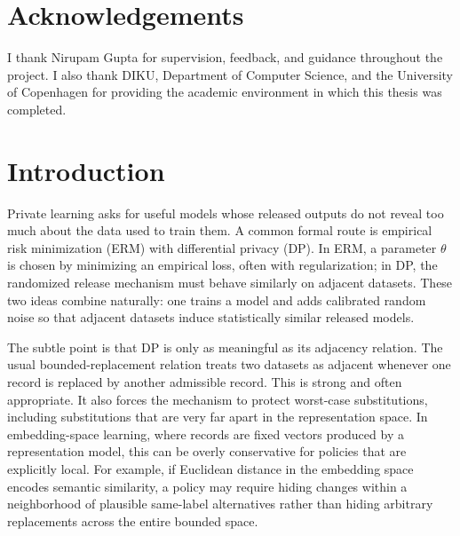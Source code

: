 \documentclass[11pt,a4paper]{report}
\theoremstyle{plain}
\theoremstyle{definition}
\theoremstyle{remark}
\begin{document}
\begin{abstract}
The thesis also develops a nonconvex transcript extension for DP-SGD.  This part distinguishes known-inclusion revealed transcripts, safe hidden-inclusion certificates obtained by post-processing, and observation-model-specific hidden-mixture diagnostics.  The theory uses probability kernels, kernel domination, and reference Bernoulli--Gaussian experiments, and records operator-norm sensitivity certificates for binary and multiclass tanh networks.  A controlled synthetic nonconvex experiment shows that a finite-prior Bayesian transcript attack perfectly reconstructs the noiseless known-inclusion transcript, while Ball-DP and standard DP-SGD both suppress the attack to chance-level success.  Ball-DP achieves this empirical protection with a noise multiplier about four times smaller and substantially higher public accuracy, supporting the thesis's central message in a limited nonconvex setting.
\end{abstract}

\chapter*{Acknowledgements}
I thank Nirupam Gupta for supervision, feedback, and guidance throughout the project.  I also thank DIKU, Department of Computer Science, and the University of Copenhagen for providing the academic environment in which this thesis was completed.

\tableofcontents
\listoffigures
\listoftables

\chapter{Introduction}
\label{ch:introduction}

Private learning asks for useful models whose released outputs do not reveal too much about the data used to train them.  A common formal route is empirical risk minimization (ERM) with differential privacy (DP).  In ERM, a parameter $\theta$ is chosen by minimizing an empirical loss, often with regularization; in DP, the randomized release mechanism must behave similarly on adjacent datasets.  These two ideas combine naturally: one trains a model and adds calibrated random noise so that adjacent datasets induce statistically similar released models.

The subtle point is that DP is only as meaningful as its adjacency relation.  The usual bounded-replacement relation treats two datasets as adjacent whenever one record is replaced by another admissible record.  This is strong and often appropriate.  It also forces the mechanism to protect worst-case substitutions, including substitutions that are very far apart in the representation space.  In embedding-space learning, where records are fixed vectors produced by a representation model, this can be overly conservative for policies that are explicitly local.  For example, if Euclidean distance in the embedding space encodes semantic similarity, a policy may require hiding changes within a neighborhood of plausible same-label alternatives rather than hiding arbitrary replacements across the entire bounded space.
\end{document}
